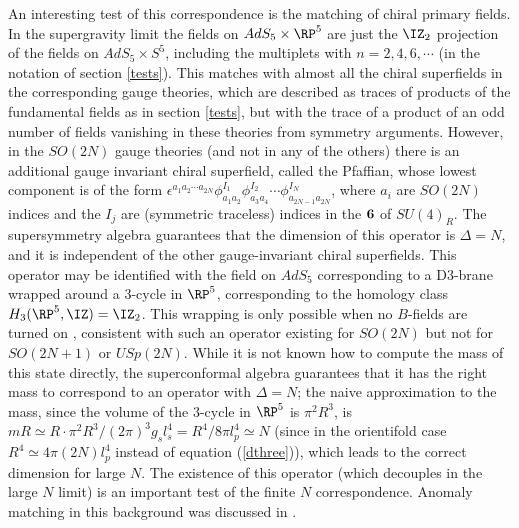An interesting test of this correspondence is the matching of chiral
primary fields. In the supergravity limit the fields on $AdS_5\times
\RP^5$ are just the $\IZ_2$ projection of the fields on $AdS_5\times
S^5$, including the multiplets with $n=2,4,6,\cdots$ (in the notation
of section \ref{tests}). This matches with almost all the chiral
superfields in the corresponding gauge theories, which are described
as traces of products of the fundamental fields as in section
\ref{tests}, but with the trace of a product of an odd number of
fields vanishing in these theories from symmetry arguments. However,
in the $SO(2N)$ gauge theories (and not in any of the others) there is
an additional gauge invariant chiral superfield, called the Pfaffian,
whose lowest component is of the form $\epsilon^{a_1 a_2 \cdots
a_{2N}} \phi^{I_1}_{a_1 a_2} \phi^{I_2}_{a_3 a_4} \cdots
\phi^{I_N}_{a_{2N-1} a_{2N}}$, where $a_i$ are $SO(2N)$ indices and
the $I_j$ are (symmetric traceless) indices in the $\bf 6$ of
$SU(4)_R$. The supersymmetry algebra guarantees that the dimension of
this operator is $\Delta=N$, and it is independent of the other
gauge-invariant chiral superfields. This operator may be identified
with the field on $AdS_5$ corresponding to a D3-brane wrapped around a
3-cycle in $\RP^5$, corresponding to the homology class $H_3(\RP^5,
\IZ) = \IZ_2$. This wrapping is only possible when no $B$-fields are
turned on \cite{Witten:1998xy}, consistent with such an operator
existing for $SO(2N)$ but not for $SO(2N+1)$ or $USp(2N)$. While it is
not known how to compute the mass of this state directly, the
superconformal algebra guarantees that it has the right mass to
correspond to an operator with $\Delta=N$; the naive approximation to
the mass, since the volume of the 3-cycle in $\RP^5$ is $\pi^2 R^3$, 
is $m R \simeq R
\cdot \pi^2 R^3 / (2\pi)^3 g_s l_s^4 = R^4 / 8\pi l_p^4 \simeq N$
(since in the orientifold case $R^4 \simeq 4\pi (2N) l_p^4$ instead of
equation (\ref{dthree})), which leads to the correct dimension for
large $N$. The existence of this operator (which decouples in the
large $N$ limit) is an important test of the finite $N$
correspondence. Anomaly matching in this background was discussed in
\cite{Blau:1999vz}.

